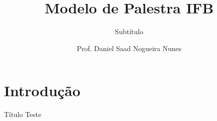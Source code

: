 \documentclass{palestra}
\author{Prof. Daniel Saad Nogueira Nunes}
\title{Modelo de Palestra IFB}
\subtitle{Subtítulo}
\institute{Instituto Federal de Brasília, Câmpus Taguatinga}
\date{}
\begin{document}
\maketitle

\section{Introdução}

\begin{frame}{Título}
	Teste
\end{frame}
\end{document}
